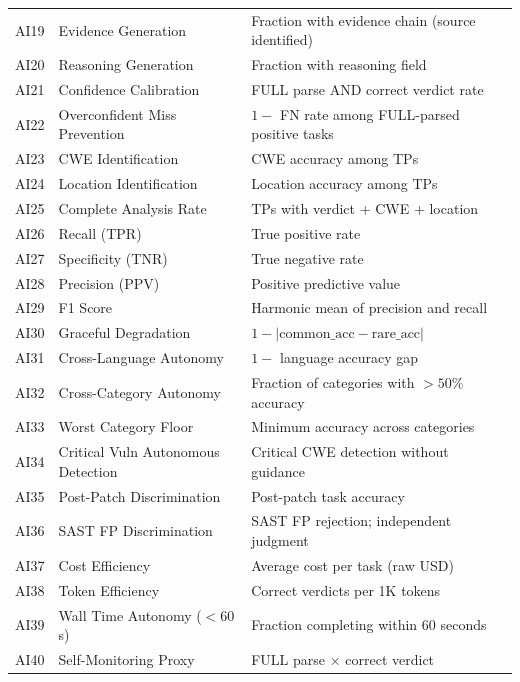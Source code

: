 \documentclass[10pt,twocolumn]{article}
\begin{document}
\begin{table}[t]
\begin{tabular}{@{}r l p{7.5cm}@{}}
AI19 & Evidence Generation                 & Fraction with evidence chain (source identified) \\
AI20 & Reasoning Generation                & Fraction with reasoning field \\
AI21 & Confidence Calibration              & FULL parse AND correct verdict rate \\
AI22 & Overconfident Miss Prevention       & $1 -$ FN rate among FULL-parsed positive tasks \\
AI23 & CWE Identification                  & CWE accuracy among TPs \\
AI24 & Location Identification             & Location accuracy among TPs \\
AI25 & Complete Analysis Rate              & TPs with verdict + CWE + location \\
AI26 & Recall (TPR)                        & True positive rate \\
AI27 & Specificity (TNR)                   & True negative rate \\
AI28 & Precision (PPV)                     & Positive predictive value \\
AI29 & F1 Score                            & Harmonic mean of precision and recall \\
AI30 & Graceful Degradation                & $1 - |\text{common\_acc} - \text{rare\_acc}|$ \\
AI31 & Cross-Language Autonomy             & $1 -$ language accuracy gap \\
AI32 & Cross-Category Autonomy             & Fraction of categories with ${>}50\%$ accuracy \\
AI33 & Worst Category Floor                & Minimum accuracy across categories \\
AI34 & Critical Vuln Autonomous Detection  & Critical CWE detection without guidance \\
AI35 & Post-Patch Discrimination           & Post-patch task accuracy \\
AI36 & SAST FP Discrimination              & SAST FP rejection; independent judgment \\
AI37 & Cost Efficiency                     & Average cost per task (raw USD) \\
AI38 & Token Efficiency                    & Correct verdicts per 1K tokens \\
AI39 & Wall Time Autonomy ($< 60$s)        & Fraction completing within 60 seconds \\
AI40 & Self-Monitoring Proxy               & FULL parse ${\times}$ correct verdict \\

\end{tabular}
\end{table}
\end{document}
